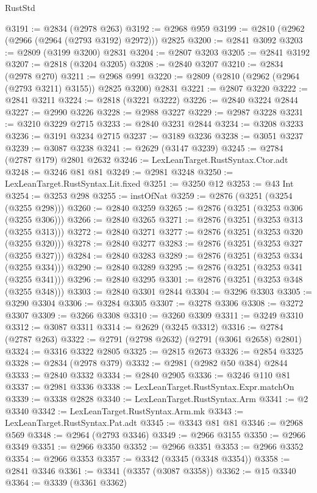 \begin{lexlean}{RustStd}
\begin{coremodule}
@3191 := @2834 (@2978 @263)
@3192 := @2968 @959
@3199 := @2810 (@2962 (@2966 (@2964 (@2793 @3192) @2972))) @2825
@3200 := @2841 @3092
@3203 := @2809 (@3199 @3200) @2831
@3204 := @2807 @3203
@3205 := @2841 @3192
@3207 := @2818 (@3204 @3205)
@3208 := @2840 @3207
@3210 := @2834 (@2978 @270)
@3211 := @2968 @991
@3220 := @2809 (@2810 (@2962 (@2964 (@2793 @3211) @3155)) @2825 @3200) @2831
@3221 := @2807 @3220
@3222 := @2841 @3211
@3224 := @2818 (@3221 @3222)
@3226 := @2840 @3224 @2844
@3227 := @2990 @3226
@3228 := @2988 @3227
@3229 := @2987 @3228
@3231 := @3210 @3229 @2715
@3233 := @2840 @3231 @2844
@3234 := @3208 @3233
@3236 := @3191 @3234 @2715
@3237 := @3189 @3236
@3238 := @3051 @3237
@3239 := @3087 @3238
@3241 := @2629 (@3147 @3239)
@3245 := @2784 (@2787 @179) @2801 @2632
@3246 := LexLeanTarget.RustSyntax.Ctor.adt
@3248 := @3246 @81 @81
@3249 := @2981 @3248
@3250 := LexLeanTarget.RustSyntax.Lit.fixed
@3251 := @3250 @12
@3253 := @43 Int
@3254 := @3253 @298
@3255 := instOfNat
@3259 := @2876 (@3251 (@3254 (@3255 @298)))
@3260 := @2840 @3259
@3265 := @2876 (@3251 (@3253 @306 (@3255 @306)))
@3266 := @2840 @3265
@3271 := @2876 (@3251 (@3253 @313 (@3255 @313)))
@3272 := @2840 @3271
@3277 := @2876 (@3251 (@3253 @320 (@3255 @320)))
@3278 := @2840 @3277
@3283 := @2876 (@3251 (@3253 @327 (@3255 @327)))
@3284 := @2840 @3283
@3289 := @2876 (@3251 (@3253 @334 (@3255 @334)))
@3290 := @2840 @3289
@3295 := @2876 (@3251 (@3253 @341 (@3255 @341)))
@3296 := @2840 @3295
@3301 := @2876 (@3251 (@3253 @348 (@3255 @348)))
@3303 := @2840 @3301 @2844
@3304 := @3296 @3303
@3305 := @3290 @3304
@3306 := @3284 @3305
@3307 := @3278 @3306
@3308 := @3272 @3307
@3309 := @3266 @3308
@3310 := @3260 @3309
@3311 := @3249 @3310
@3312 := @3087 @3311
@3314 := @2629 (@3245 @3312)
@3316 := @2784 (@2787 @263)
@3322 := @2791 (@2798 @2632) (@2791 (@3061 @2658) @2801)
@3324 := @3316 @3322 @2805
@3325 := @2815 @2673
@3326 := @2854 @3325
@3328 := @2834 (@2978 @379)
@3332 := @2981 (@2982 @50 @384) @2844
@3333 := @2840 @3332
@3334 := @2840 @2905
@3336 := @3246 @110 @81
@3337 := @2981 @3336
@3338 := LexLeanTarget.RustSyntax.Expr.matchOn
@3339 := @3338 @2828
@3340 := LexLeanTarget.RustSyntax.Arm
@3341 := @2 @3340
@3342 := LexLeanTarget.RustSyntax.Arm.mk
@3343 := LexLeanTarget.RustSyntax.Pat.adt
@3345 := @3343 @81 @81
@3346 := @2968 @569
@3348 := @2964 (@2793 @3346)
@3349 := @2966 @3155
@3350 := @2966 @3349
@3351 := @2966 @3350
@3352 := @2966 @3351
@3353 := @2966 @3352
@3354 := @2966 @3353
@3357 := @3342 (@3345 (@3348 @3354))
@3358 := @2841 @3346
@3361 := @3341 (@3357 (@3087 @3358))
@3362 := @15 @3340
@3364 := @3339 (@3361 @3362)

\end{coremodule}
\end{lexlean}
